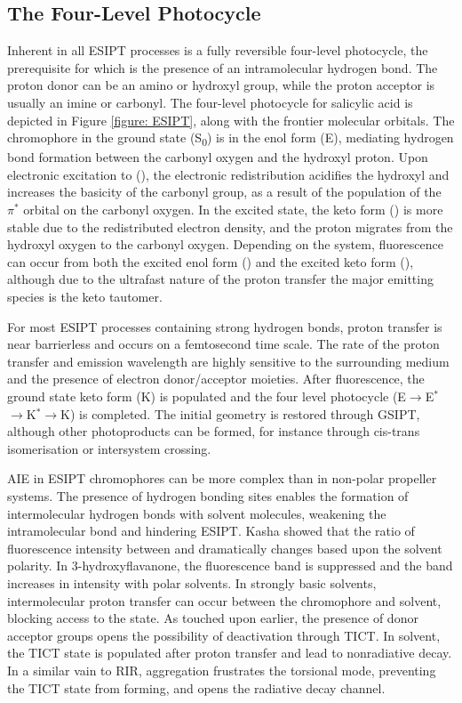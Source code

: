 \subsection{The Four-Level Photocycle}
Inherent in all \ac{ESIPT} processes is a fully reversible four-level photocycle, the prerequisite for which is the presence of an intramolecular hydrogen bond. The proton donor can be an amino or hydroxyl group, while the proton acceptor is usually an imine or carbonyl. The four-level photocycle for salicylic acid is depicted in Figure \ref{figure: ESIPT}, along with the frontier molecular orbitals. The chromophore in the ground state (S\textsubscript{0}) is in the enol form (E), mediating hydrogen bond formation between the carbonyl oxygen and the hydroxyl proton. Upon electronic excitation to \sone{} (\Estar{}), the electronic redistribution acidifies the hydroxyl and increases the basicity of the carbonyl group, as a result of the population of the $\pi^\ast$ orbital on the carbonyl oxygen. In the excited state, the keto form (\Kstar{}) is more stable due to the redistributed electron density, and the proton migrates from the hydroxyl oxygen to the carbonyl oxygen. Depending on the system, fluorescence can occur from both the excited enol form (\Estar) and the excited keto form (\Kstar), although due to the ultrafast nature of the proton transfer the major emitting species is the keto tautomer.\cite{Zhao2012} 

For most \ac{ESIPT} processes containing strong hydrogen bonds, proton transfer is near barrierless and  occurs on a femtosecond time scale.\cite{Padalkar2015} The rate of the proton transfer and emission wavelength are highly sensitive to the surrounding medium and the presence of electron donor/acceptor moieties.\cite{Demchenko2013,Lin2017a,Li2017c} After fluorescence, the ground state keto form (K) is populated and the four level photocycle (E$\rightarrow$E$^{\ast}$$\rightarrow$K$^{\ast}$$\rightarrow$K) is completed. The initial geometry is restored through \ac{GSIPT}, although other photoproducts can be formed, for instance through cis-trans isomerisation or intersystem crossing.\cite{Al-Soufi1990}

\ac{AIE} in \ac{ESIPT} chromophores can be more complex than in non-polar propeller systems. The presence of hydrogen bonding sites enables the formation of intermolecular hydrogen bonds with solvent molecules, weakening the intramolecular bond and hindering \ac{ESIPT}.\cite{Cheng2015f} Kasha showed that the ratio of fluorescence intensity between \Estar and \Kstar dramatically changes based upon the solvent polarity.\cite{Kasha1986} In 3-hydroxyflavanone, the \Kstar fluorescence band is suppressed and the \Estar band increases in intensity with polar solvents. In strongly basic solvents, intermolecular proton transfer can occur between the chromophore and solvent, blocking access to the \Kstar state\cite{Laurent2014}. As touched upon earlier, the presence of donor acceptor groups opens the possibility of deactivation through \acf{TICT}. In solvent, the \ac{TICT} state is populated after proton transfer and lead to nonradiative decay. In a similar vain to \ac{RIR}, aggregation frustrates the torsional mode, preventing the \ac{TICT} state from forming, and opens the radiative decay channel.\cite{Park2017,Wu2015a}

